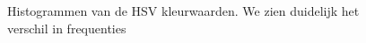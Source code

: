 \documentclass[a4paper,kulak]{kulakarticle}
\begin{document}
	\begin{figure}[H]
	\centering
	\qquad
	\qquad
	
	\caption{Histogrammen van de HSV kleurwaarden. We zien duidelijk het verschil in frequenties}
	\label{figuur HSVHIST}
	\end{figure}
\end{document}
